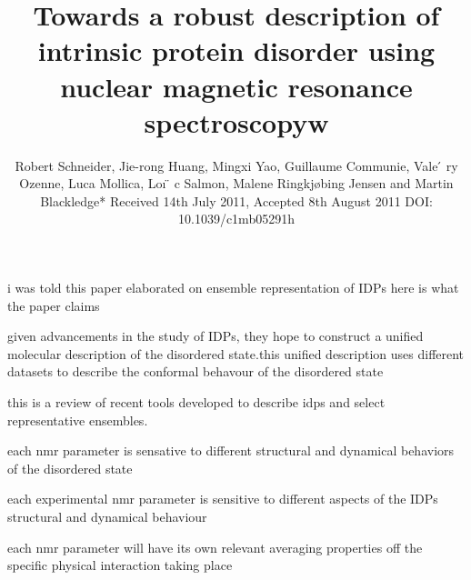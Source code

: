 \documentclass{article}
\title{Towards a robust description of intrinsic protein disorder using nuclear magnetic resonance spectroscopyw}
\subtitle{Robert Schneider, Jie-rong Huang, Mingxi Yao, Guillaume Communie, Vale ́ ry Ozenne, Luca Mollica, Loı ̈ c Salmon, Malene Ringkjøbing Jensen and Martin Blackledge* Received 14th July 2011, Accepted 8th August 2011 DOI: 10.1039/c1mb05291h}
\begin{document}
i was told this paper elaborated on ensemble representation of IDPs
here is what the paper claims
\begin{items}
    \item given advancements in the study of IDPs, they hope to construct a unified molecular description of the disordered state.this unified description uses different datasets to describe the conformal behavour of the disordered state
    \item this is a review of recent tools developed to describe idps and select representative ensembles.
    \item each nmr parameter is sensative to different structural and dynamical behaviors of the disordered state
    \item each experimental nmr parameter is sensitive to different aspects of the IDPs structural and dynamical behaviour
    \item each nmr parameter will have its own relevant averaging properties off the specific physical interaction taking place
\end{items}
\end{document}
